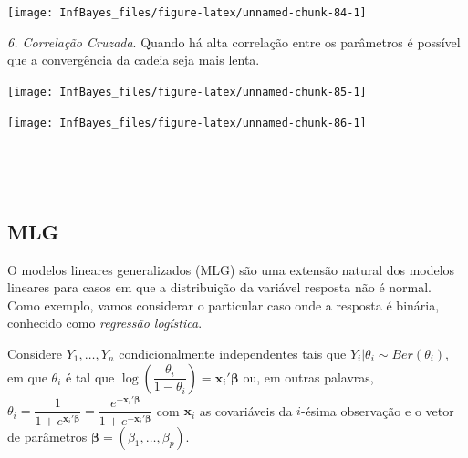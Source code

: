 \documentclass[
]{book}
\newenvironment{Shaded}{\begin{snugshade}}{\end{snugshade}}
\newcommand{\DataTypeTok}[1]{\textcolor[rgb]{0.13,0.29,0.53}{#1}}
\newcommand{\KeywordTok}[1]{\textcolor[rgb]{0.13,0.29,0.53}{\textbf{#1}}}
\newcommand{\NormalTok}[1]{#1}
\newcommand{\OperatorTok}[1]{\textcolor[rgb]{0.81,0.36,0.00}{\textbf{#1}}}
\newcommand{\StringTok}[1]{\textcolor[rgb]{0.31,0.60,0.02}{#1}}
\begin{document}
\begin{center}\texttt{[image: InfBayes\_files/figure-latex/unnamed-chunk-84-1]} \end{center}

\emph{6. Correlação Cruzada}. Quando há alta correlação entre os parâmetros é possível que a convergência da cadeia seja mais lenta.

\begin{Shaded}
\end{Shaded}

\begin{center}\texttt{[image: InfBayes\_files/figure-latex/unnamed-chunk-85-1]} \end{center}

\begin{Shaded}
\end{Shaded}

\begin{center}\texttt{[image: InfBayes\_files/figure-latex/unnamed-chunk-86-1]} \end{center}

\(~\)

\(~\)

\hypertarget{mlg}{%
\subsection{MLG}\label{mlg}}

O modelos lineares generalizados (MLG) são uma extensão natural dos modelos lineares para casos em que a distribuição da variável resposta não é normal. Como exemplo, vamos considerar o particular caso onde a resposta é binária, conhecido como \emph{regressão logística}.

Considere \(Y_1,\ldots,Y_n\) condicionalmente independentes tais que \(Y_i|\theta_i \sim \textit{Ber}(\theta_i)\), em que \(\theta_i\) é tal que \(\log\left(\dfrac{\theta_i}{1-\theta_i}\right) = \boldsymbol x_i' \boldsymbol\beta\) ou, em outras palavras, \(\theta_i = \dfrac{1}{1+e^{\boldsymbol x_i' \boldsymbol\beta}} = \dfrac{e^{-\boldsymbol x_i' \boldsymbol\beta}}{1+e^{-\boldsymbol x_i' \boldsymbol\beta}}\) com \(\boldsymbol x_i\) as covariáveis da \(i\)-ésima observação e o vetor de parâmetros \(\boldsymbol\beta=(\beta_1,\ldots,\beta_p)\).
\end{document}
